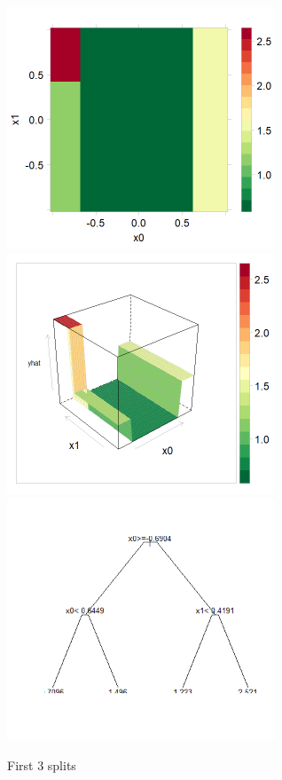 \documentclass[10pt,openany]{article}
\numberwithin{definition}{section}
\numberwithin{example}{section}
\numberwithin{equation}{section}
\numberwithin{figure}{section}
\begin{document}
\begin{figure}
\noindent \begin{centering}
\includegraphics[width=80mm]{fig/rpart-3-split-levelplot}~
\includegraphics[width=80mm]{fig/rpart-3-split-wireframe}~
\includegraphics[width=80mm]{fig/rpart-3-split-tree}
\par\end{centering}

\protect\caption{\label{fig:3-spits}First 3 splits}
\end{figure}
\end{document}
